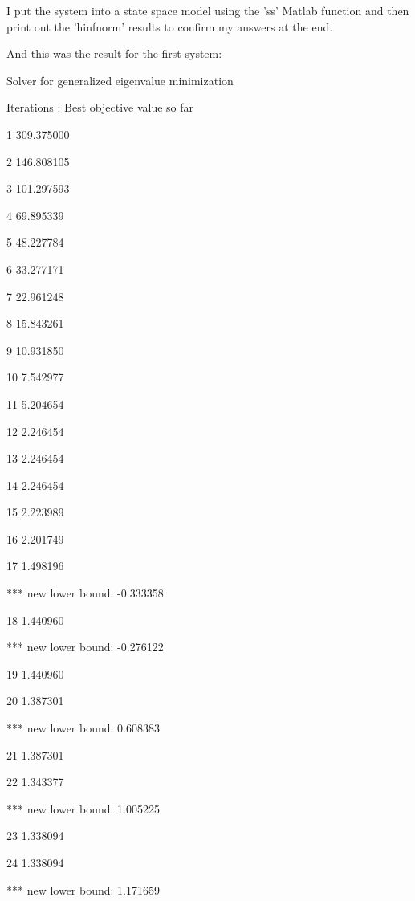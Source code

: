 \documentclass[12pt, letterpaper]{article}
\begin{document}
I put the system into a state space model using the 'ss' Matlab function and then print out the 'hinfnorm' results to confirm my answers at the end.

And this was the result for the first system:

Solver for generalized eigenvalue minimization 

Iterations   :    Best objective value so far 

1                 309.375000

2                 146.808105

3                 101.297593

4                  69.895339

5                  48.227784

6                  33.277171

7                  22.961248

8                  15.843261

9                  10.931850

10                   7.542977

11                   5.204654

12                   2.246454

13                   2.246454

14                   2.246454

15                   2.223989

16                   2.201749

17                   1.498196

***                 new lower bound:    -0.333358

18                   1.440960

***                 new lower bound:    -0.276122

19                   1.440960

20                   1.387301

***                 new lower bound:     0.608383

21                   1.387301

22                   1.343377

***                 new lower bound:     1.005225

23                   1.338094

24                   1.338094

***                 new lower bound:     1.171659
\end{document}
